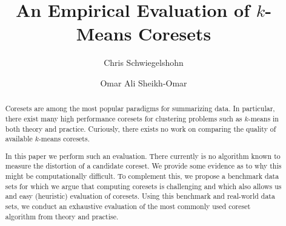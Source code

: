 \documentclass[a4paper,UKenglish,cleveref, autoref, thm-restate]{sea2022}
\title{An Empirical Evaluation of $k$-Means Coresets} %
\author{Chris Schwiegelshohn}{Department of Computer Science, Aarhus University, Denmark }{schwiegelshohn@cs.au.dk}{[orcid]}{(Optional) author-specific funding acknowledgements}%
\author{Omar Ali Sheikh-Omar
}{Department of Computer Science, Aarhus University, Denmark}{omar@cs.au.dk}{https://orcid.org/0000-0002-0042-5231}{Innovation Fund Denmark, grant agreement 0153-00233A.}
\begin{document}
\maketitle

\begin{abstract}
Coresets are among the most popular paradigms for summarizing data. In particular, there exist many high performance coresets for clustering problems such as $k$-means in both theory and practice. Curiously, there exists no work on comparing the quality of available $k$-means coresets. 

In this paper we perform such an evaluation. There currently is no algorithm known to measure the distortion of a candidate coreset. We provide some evidence as to why this might be computationally difficult.
To complement this, we propose a benchmark data sets for which we argue that computing coresets is challenging and which also allows us and easy (heuristic) evaluation of coresets. Using this benchmark and real-world data sets, we conduct an exhaustive evaluation of the most commonly used coreset algorithm from theory and practise.
\end{abstract}

\newpage













\newpage
\appendix



\newpage


\end{document}
